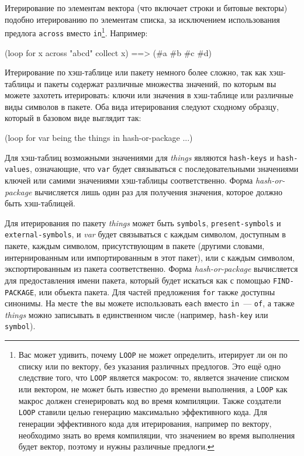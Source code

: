 Итерирование по элементам вектора (что включает строки и битовые векторы) подобно
итерированию по элементам списка, за исключением использования предлога \lstinline{across}
вместо \lstinline{in}\footnote{Вас может удивить, почему \lstinline{LOOP} не может определить,
  итерирует ли он по списку или по вектору, без указания различных предлогов. Это ещё одно
  следствие того, что \lstinline{LOOP} является макросом: то, является значение списком или
  вектором, не может быть известно до времени выполнения, а \lstinline{LOOP} как макрос
  должен сгенерировать код во время компиляции. Также создатели \lstinline{LOOP} ставили
  целью генерацию максимально эффективного кода. Для генерации эффективного кода для
  итерирования, например по вектору, необходимо знать во время компиляции, что значением
  во время выполнения будет вектор, поэтому и нужны различные предлоги.}. Например:

\begin{myverb}
(loop for x across "abcd" collect x) ==> (#\bslash{}a #\bslash{}b #\bslash{}c #\bslash{}d)
\end{myverb}

Итерирование по хэш-таблице или пакету немного более сложно, так как хэш-таблицы и пакеты
содержат различные множества значений, по которым вы можете захотеть итерировать: ключи
или значения в хэш-таблице или различные виды символов в пакете. Оба вида итерирования
следуют сходному образцу, который в базовом виде выглядит так:

\begin{myverb}
(loop for var being the things in hash-or-package ...)
\end{myverb}

Для хэш-таблиц возможными значениями для \textit{things} являются \lstinline{hash-keys} и
\lstinline{hash-values}, означающие, что \lstinline{var} будет связываться с последовательными
значениями ключей или самими значениями хэш-таблицы соответственно. Форма
\textit{hash-or-package} вычисляется лишь один раз для получения значения, которое должно
быть хэш-таблицей.

Для итерирования по пакету \textit{things} может быть \lstinline{symbols},
\lstinline{present-symbols} и \lstinline{external-symbols}, и \textit{var} будет связываться с
каждым символом, доступным в пакете, каждым символом, присутствующим в пакете (другими
словами, интернированным или импортированным в этот пакет), или с каждым символом,
экспортированным из пакета соответственно. Форма \textit{hash-or-package} вычисляется для
предоставления имени пакета, который будет искаться как с помощью \lstinline{FIND-PACKAGE},
или объекта пакета. Для частей предложения \lstinline{for} также доступны синонимы. На месте
\lstinline{the} вы можете использовать \lstinline{each} вместо \lstinline{in}~--- \lstinline{of}, а также
\textit{things} можно записывать в единственном числе (например, \lstinline{hash-key} или
\lstinline{symbol}).

